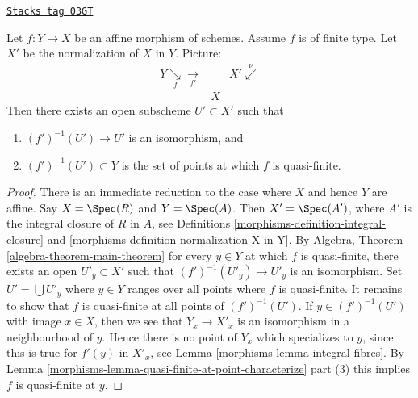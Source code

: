 \begin{theorem}

\label{morphisms-theorem-main-theorem}
\href{https://stacks.math.columbia.edu/tag/03GT}{\texttt{Stacks tag 03GT}}

Let $f : Y \to X$ be an affine morphism of schemes.
Assume $f$ is of finite type.
Let $X'$ be the normalization of $X$ in $Y$. Picture:
$$
\begin{array}{ccc}Y \underset{f}{\searrow}\underset{f'}{\longrightarrow} &  & X' \overset{\nu}{\swarrow} \\  & X & \end{array}
$$
Then there exists an open subscheme $U' \subset X'$ such that
\begin{enumerate}
\item $(f')^{-1}(U') \to U'$ is an isomorphism, and
\item $(f')^{-1}(U') \subset Y$ is the set of points at which
$f$ is quasi-finite.
\end{enumerate}
\end{theorem}

\begin{proof}

There is an immediate reduction to the case where $X$ and hence $Y$
are affine. Say $X = \Spec(R)$ and $Y = \Spec(A)$.
Then $X' = \Spec(A')$, where $A'$ is the integral closure of
$R$ in $A$, see Definitions \ref{morphisms-definition-integral-closure}
and \ref{morphisms-definition-normalization-X-in-Y}. By
Algebra, Theorem \ref{algebra-theorem-main-theorem}
for every $y \in Y$ at which $f$ is quasi-finite, there exists an
open $U'_y \subset X'$ such that $(f')^{-1}(U'_y) \to U'_y$
is an isomorphism. Set $U' = \bigcup U'_y$ where $y \in Y$ ranges
over all points where $f$ is quasi-finite. It remains to show that
$f$ is quasi-finite at all points of $(f')^{-1}(U')$.
If $y \in (f')^{-1}(U')$ with image $x \in X$, then we see that
$Y_x \to X'_x$ is an isomorphism in a neighbourhood of $y$. Hence
there is no point of $Y_x$ which specializes to $y$, since this
is true for $f'(y)$ in $X'_x$, see Lemma \ref{morphisms-lemma-integral-fibres}.
By Lemma \ref{morphisms-lemma-quasi-finite-at-point-characterize} part (3)
this implies $f$ is quasi-finite at $y$.
\end{proof}

